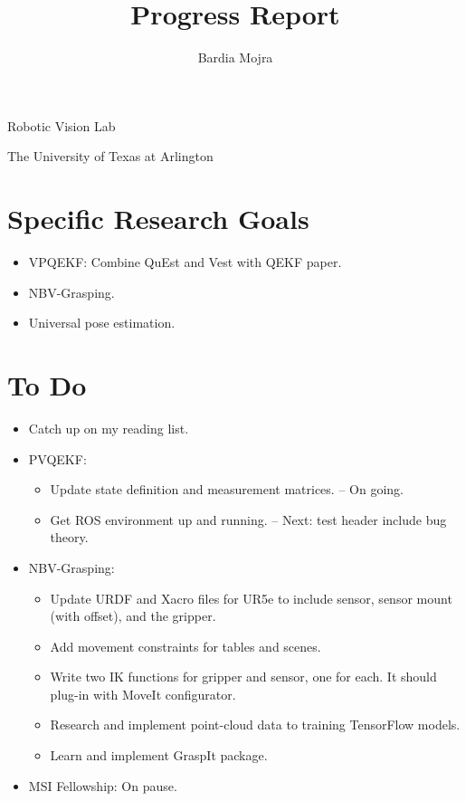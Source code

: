 \documentclass[11pt]{article}
\title{Progress Report}
\author{Bardia Mojra}
\begin{document}
\maketitle
\thispagestyle{empty}

\bigskip
\bigskip
\begin{center}
      Robotic Vision Lab
\end{center}

\begin{center}
      The University of Texas at Arlington
\end{center}

\newpage

\section{Specific Research Goals}
\begin{itemize}
      \item VPQEKF: Combine QuEst and Vest with QEKF paper.
      \item NBV-Grasping.
      \item Universal pose estimation.
\end{itemize}

\section{To Do}
\begin{itemize}
  \item Catch up on my reading list.
  \item PVQEKF:
  \begin{itemize}
      \item Update state definition and measurement matrices. -- On going.
      \item Get ROS environment up and running. -- Next: test header include bug theory.
  \end{itemize}
  \item NBV-Grasping:
      \begin{itemize}
      \item Update URDF and Xacro files for UR5e to include sensor, sensor mount (with offset), and the gripper.
      \item Add movement constraints for tables and scenes.
      \item Write two IK functions for gripper and sensor, one for each. It should plug-in with MoveIt configurator.
      \item Research and implement point-cloud data to training TensorFlow models.
      \item Learn and implement GraspIt package.
      \end{itemize}
  \item MSI Fellowship: On pause.
\end{itemize}
\end{document}
